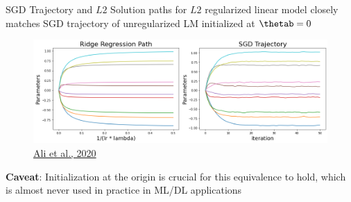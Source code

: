 \begin{vbframe}{SGD Trajectory and $L2$}
Solution paths for $L2$ regularized linear model closely matches SGD trajectory of unregularized LM initialized at $\thetab=0$
\lz
  \begin{figure}
    \centering
      {\includegraphics{figure_man/ridge-vs-sgd-path.png}}
      \scriptsize{\\ \href{https://proceedings.mlr.press/v119/ali20a/ali20a.pdf}{Ali et al., 2020}\\}
  \end{figure}

\textbf{Caveat}: Initialization at the origin is crucial for this equivalence to hold, which is almost never used in practice in ML/DL applications

\end{vbframe}

\endlecture

